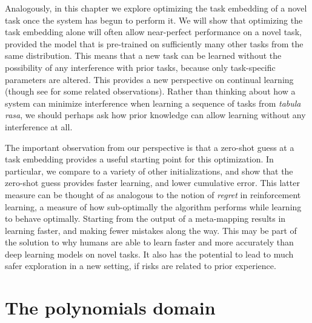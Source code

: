Analogously, in this chapter we explore optimizing the task embedding of a novel task once the system has begun to perform it. We will show that optimizing the task embedding alone will often allow near-perfect performance on a novel task, provided the model that is pre-trained on sufficiently many other tasks from the same distribution. This means that a new task can be learned without the possibility of any interference with prior tasks, because only task-specific parameters are altered. This provides a new perspective on continual learning (though see \citep{Oswald2020} for some related observations). Rather than thinking about how a system can minimize interference when learning a sequence of tasks from \emph{tabula rasa}, we should perhaps ask how prior knowledge can allow learning without any interference at all. \par 
The important observation from our perspective is that a zero-shot guess at a task embedding provides a useful starting point for this optimization. In particular, we compare to a variety of other initializations, and show that the zero-shot guess provides faster learning, and lower cumulative error. This latter measure can be thought of as analogous to the notion of \emph{regret} in reinforcement learning, a measure of how sub-optimally the algorithm performs while learning to behave optimally. Starting from the output of a meta-mapping results in learning faster, and making fewer mistakes along the way. This may be part of the solution to why humans are able to learn faster and more accurately than deep learning models on novel tasks. It also has the potential to lead to much safer exploration in a new setting, if risks are related to prior experience. \par   

\section{The polynomials domain}


